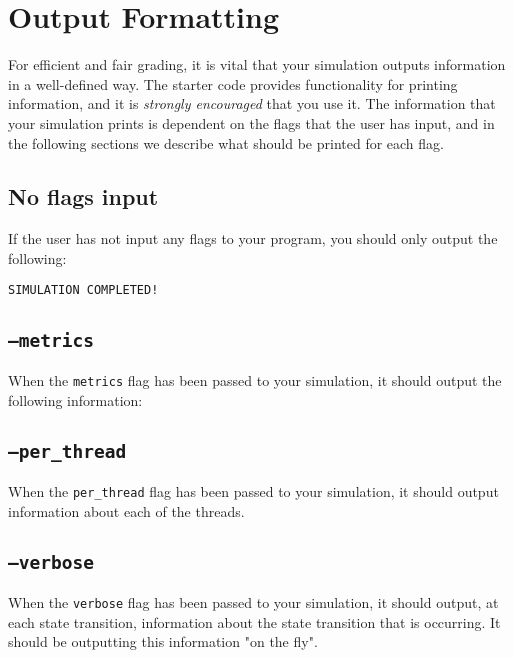 \documentclass[main.tex]{subfiles}
\begin{document}
\section{Output Formatting}
\label{sec:out-format}

For efficient and fair grading, it is vital that your simulation outputs information in a well-defined way. The starter code provides functionality for printing information, and it is \emph{strongly encouraged} that you use it. The information that your simulation prints is dependent on the flags that the user has input, and in the following sections we describe what should be printed for each flag.

\subsection{No flags input}

If the user has not input any flags to your program, you should only output the following:

\begin{verbatim}
SIMULATION COMPLETED!
\end{verbatim}

\subsection{\texttt{--metrics}}

When the \texttt{metrics} flag has been passed to your simulation, it should output the following information:



\subsection{\texttt{--per\_thread}}

When the \texttt{per\_thread} flag has been passed to your simulation, it should output information about each of the threads.



\subsection{\texttt{--verbose}}

When the \texttt{verbose} flag has been passed to your simulation, it should output, at each state transition, information about the state transition that is occurring. It should be outputting this information "on the fly".
\end{document}
